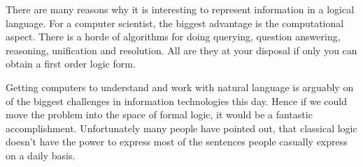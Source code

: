 \documentclass[12pt]{article}
\begin{document}

There are many reasons why it is interesting to represent information in a logical language. For a computer scientist, the biggest advantage is the computational aspect. There is a horde of algorithms for doing querying, question answering, reasoning, unification and resolution. All are they at your disposal if only you can obtain a first order logic form.

Getting computers to understand and work with natural language is arguably on of the biggest challenges in information technologies this day. Hence if we could move the problem into the space of formal logic, it would be a fantastic accomplishment. Unfortunately many people have pointed out, that classical logic doesn't have the power to express most of the sentences people casually express on a daily basis.
\end{document}
